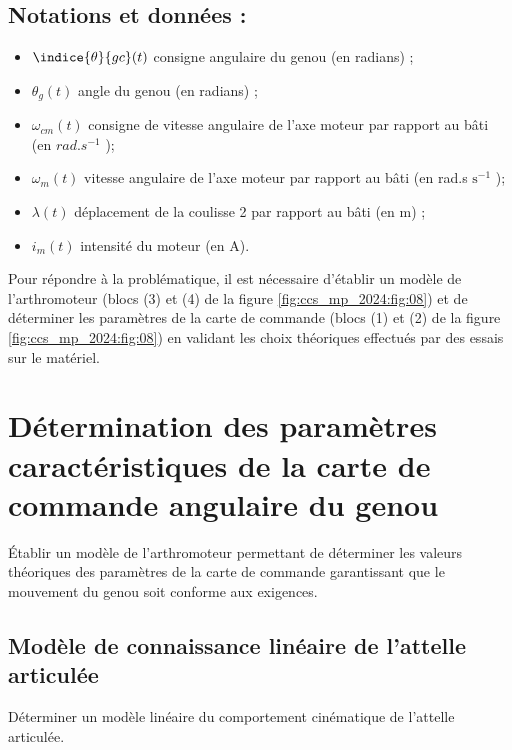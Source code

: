 \subsection*{Notations et données :}
\begin{itemize}
  \item $\indice{\theta}{g c}(t)$ consigne angulaire du genou (en radians) ;

  \item $\theta_{g}(t)$ angle du genou (en radians) ;

  \item $\omega_{c m}(t)$ consigne de vitesse angulaire de l'axe moteur par rapport au bâti (en $\si{rad.s^{-1}}$ );

  \item $\omega_{m}(t)$ vitesse angulaire de l'axe moteur par rapport au bâti (en rad.s $\mathrm{s}^{-1}$ );

  \item $\lambda(t)$ déplacement de la coulisse 2 par rapport au bâti (en m) ;

  \item $i_{m}(t)$ intensité du moteur (en A).

\end{itemize}

Pour répondre à la problématique, il est nécessaire d'établir un modèle de l'arthromoteur (blocs (3) et (4) de la figure \ref{fig:ccs_mp_2024:fig:08}) et de déterminer les paramètres de la carte de commande (blocs (1) et (2) de la figure \ref{fig:ccs_mp_2024:fig:08}) en validant les choix théoriques effectués par des essais sur le matériel.

\section{Détermination des paramètres caractéristiques de la carte de commande angulaire du genou}
\begin{obj}
Établir un modèle de l'arthromoteur permettant de déterminer les valeurs théoriques des paramètres de la carte de commande garantissant que le mouvement du genou soit conforme aux exigences.
\end{obj}
\subsection{Modèle de connaissance linéaire de l'attelle articulée}

\begin{obj}
Déterminer un modèle linéaire du comportement cinématique de l'attelle articulée.
\end{obj}

